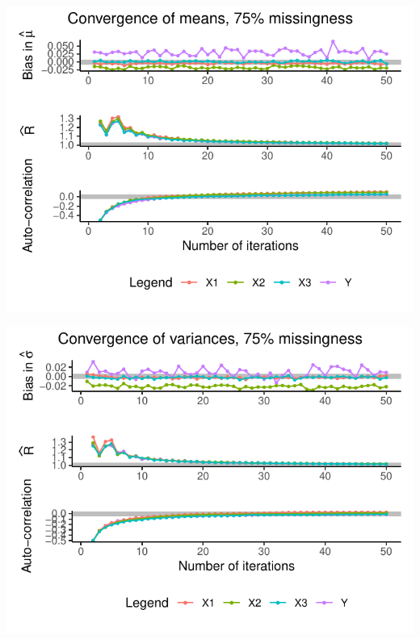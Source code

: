 \documentclass[Royal,times,sageh]{sagej}
\begin{document}
\begin{flushleft}\includegraphics{manuscript_files/figure-latex/unnamed-chunk-11-1} \end{flushleft}

\begin{flushleft}\includegraphics{manuscript_files/figure-latex/unnamed-chunk-12-1} \end{flushleft}
\end{document}
